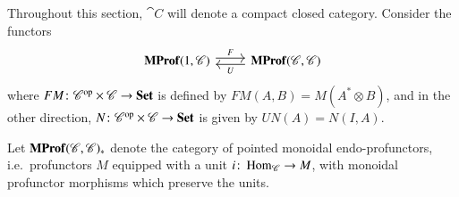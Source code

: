 \documentclass[12pt,oneside,article,draft]{memoir}
\begin{document}
\begin{enumerate}
Throughout this section, $\cat{C}$ will denote a compact closed category.
Consider the functors
\begin{equation}\label{eqn:functors 1C CC}
\begin{tikzcd}
	\MProf(1,\cat{C}) \ar[r,shift left,"F"]
	& \MProf(\cat{C},\cat{C}) \ar[l,shift left,"U"]
\end{tikzcd}
\end{equation}
where $FM\colon{\mathscr{C}}^{\text{op}}\times\mathscr{C}\to\mathbf{Set}$ is defined by $FM(A,B)=M(A^*\otimes B)$, and in the other direction, $N\colon{\mathscr{C}}^{\text{op}}\times\mathscr{C}\to\mathbf{Set}$ is given by $UN(A)=N(I,A)$.

Let $\mathbf{MProf}(\mathscr{C},\mathscr{C})_{\ast}$ denote the category of pointed monoidal endo-profunctors, i.e.~profunctors $M$ equipped with a unit $i\colon\operatorname{Hom}_{\mathscr{C}}\to M$, with monoidal profunctor morphisms which preserve the units.


\end{enumerate}
\end{document}

